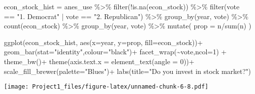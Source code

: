 \documentclass[
]{article}
\newenvironment{Shaded}{\begin{snugshade}}{\end{snugshade}}
\newcommand{\AttributeTok}[1]{\textcolor[rgb]{0.77,0.63,0.00}{#1}}
\newcommand{\DecValTok}[1]{\textcolor[rgb]{0.00,0.00,0.81}{#1}}
\newcommand{\FunctionTok}[1]{\textcolor[rgb]{0.00,0.00,0.00}{#1}}
\newcommand{\NormalTok}[1]{#1}
\newcommand{\OtherTok}[1]{\textcolor[rgb]{0.56,0.35,0.01}{#1}}
\newcommand{\SpecialCharTok}[1]{\textcolor[rgb]{0.00,0.00,0.00}{#1}}
\newcommand{\StringTok}[1]{\textcolor[rgb]{0.31,0.60,0.02}{#1}}
\begin{document}
\begin{Shaded}
\begin{Highlighting}[]
\NormalTok{econ\_stock\_hist }\OtherTok{=}\NormalTok{ anes\_use }\SpecialCharTok{\%\textgreater{}\%}
  \FunctionTok{filter}\NormalTok{(}\SpecialCharTok{!}\FunctionTok{is.na}\NormalTok{(econ\_stock))  }\SpecialCharTok{\%\textgreater{}\%}
  \FunctionTok{filter}\NormalTok{(vote }\SpecialCharTok{==} \StringTok{"1. Democrat"} \SpecialCharTok{|}\NormalTok{ vote }\SpecialCharTok{==} \StringTok{"2. Republican"}\NormalTok{) }\SpecialCharTok{\%\textgreater{}\%}
  \FunctionTok{group\_by}\NormalTok{(year, vote) }\SpecialCharTok{\%\textgreater{}\%}
  \FunctionTok{count}\NormalTok{(econ\_stock) }\SpecialCharTok{\%\textgreater{}\%}
  \FunctionTok{group\_by}\NormalTok{(year, vote) }\SpecialCharTok{\%\textgreater{}\%}
  \FunctionTok{mutate}\NormalTok{(}
    \AttributeTok{prop =}\NormalTok{ n}\SpecialCharTok{/}\FunctionTok{sum}\NormalTok{(n)}
\NormalTok{  )}
 

\FunctionTok{ggplot}\NormalTok{(econ\_stock\_hist,}
       \FunctionTok{aes}\NormalTok{(}\AttributeTok{x=}\NormalTok{year, }\AttributeTok{y=}\NormalTok{prop, }\AttributeTok{fill=}\NormalTok{econ\_stock))}\SpecialCharTok{+}
  \FunctionTok{geom\_bar}\NormalTok{(}\AttributeTok{stat=}\StringTok{"identity"}\NormalTok{,}\AttributeTok{colour=}\StringTok{"black"}\NormalTok{)}\SpecialCharTok{+}
  \FunctionTok{facet\_wrap}\NormalTok{(}\SpecialCharTok{\textasciitilde{}}\NormalTok{vote,}\AttributeTok{ncol=}\DecValTok{1}\NormalTok{) }\SpecialCharTok{+}
  \FunctionTok{theme\_bw}\NormalTok{()}\SpecialCharTok{+}
  \FunctionTok{theme}\NormalTok{(}\AttributeTok{axis.text.x =} \FunctionTok{element\_text}\NormalTok{(}\AttributeTok{angle =} \DecValTok{0}\NormalTok{))}\SpecialCharTok{+}
  \FunctionTok{scale\_fill\_brewer}\NormalTok{(}\AttributeTok{palette=}\StringTok{"Blues"}\NormalTok{)}\SpecialCharTok{+}
  \FunctionTok{labs}\NormalTok{(}\AttributeTok{title=}\StringTok{"Do you invest in stock market?"}\NormalTok{)}
\end{Highlighting}
\end{Shaded}

\texttt{[image: Project1\_files/figure-latex/unnamed-chunk-6-8.pdf]}
\end{document}
